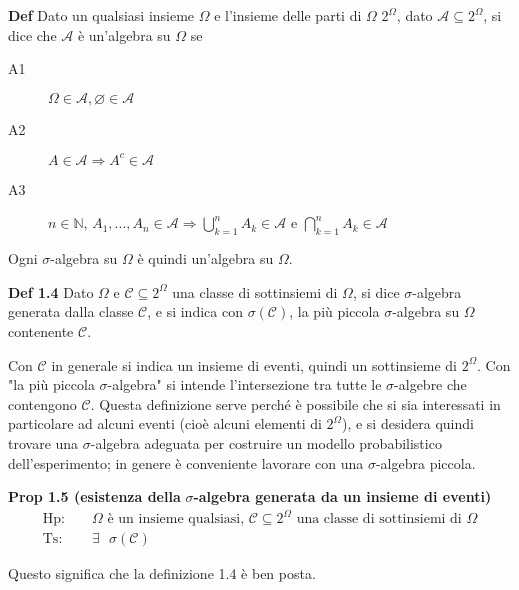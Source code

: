\documentclass{article}
\begin{document}
\textbf{Def} Dato un qualsiasi insieme $\Omega $ e l'insieme delle parti di $%
\Omega $ $2^{\Omega }$, dato $\mathcal{A}\subseteq 2^{\Omega }$, si dice che 
$\mathcal{A}$ \`{e} un'algebra su $\Omega $ se

\begin{description}
\item[A1] $\Omega \in \mathcal{A},\varnothing \in \mathcal{A}$

\item[A2] $A\in \mathcal{A}\Longrightarrow A^{c}\in \mathcal{A}$

\item[A3] $n\in 
\mathbb{N}
$, $A_{1},...,A_{n}\in \mathcal{A}\Longrightarrow \bigcup_{k=1}^{n}A_{k}\in 
\mathcal{A}$ e $\bigcap_{k=1}^{n}A_{k}\in \mathcal{A}$
\end{description}

Ogni $\sigma $-algebra su $\Omega $ \`{e} quindi un'algebra su $\Omega $.

\textbf{Def 1.4} Dato $\Omega $ e $\mathcal{C}\subseteq 2^{\Omega }$ una
classe di sottinsiemi di $\Omega $, si dice $\sigma $-algebra generata dalla
classe $\mathcal{C}$, e si indica con $\sigma \left( \mathcal{C}\right) $,
la pi\`{u} piccola $\sigma $-algebra su $\Omega $ contenente $\mathcal{C}$.

Con $\mathcal{C}$ in generale si indica un insieme di eventi, quindi un
sottinsieme di $2^{\Omega }$. Con "la pi\`{u} piccola $\sigma $-algebra" si
intende l'intersezione tra tutte le $\sigma $-algebre che contengono $%
\mathcal{C}$. Questa definizione serve perch\'{e} \`{e} possibile che si sia
interessati in particolare ad alcuni eventi (cio\`{e} alcuni elementi di $%
2^{\Omega }$), e si desidera quindi trovare una $\sigma $-algebra adeguata
per costruire un modello probabilistico dell'esperimento; in genere \`{e}
conveniente lavorare con una $\sigma $-algebra piccola.

\textbf{Prop 1.5 (esistenza della }$\sigma $\textbf{-algebra generata da un
insieme di eventi)}%
\begin{eqnarray*}
\text{Hp}\text{: } &&\Omega \text{ \`{e} un insieme qualsiasi, }\mathcal{C}%
\subseteq 2^{\Omega }\text{ una classe di sottinsiemi di }\Omega \\
\text{Ts}\text{: } &&\exists \text{ }\sigma \left( \mathcal{C}\right)
\end{eqnarray*}

Questo significa che la definizione 1.4 \`{e} ben posta.
\end{document}
